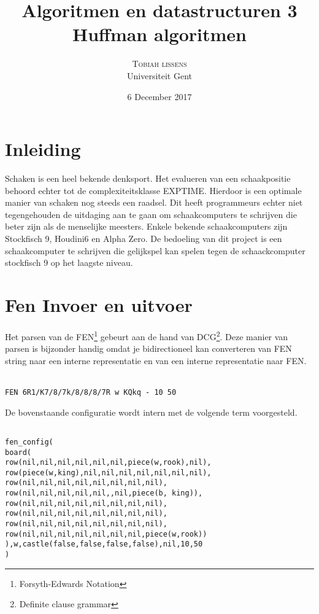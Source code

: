 \documentclass[twoside,twocolumn]{article}
\title{Algoritmen en datastructuren 3 \\ Huffman algoritmen } %
\author{%
\textsc{Tobiah lissens}\\[1ex]%
\normalsize Universiteit Gent \\ %
}
\date{6 December 2017} %
\newcommand{\code}[1]{\texttt{#1}}
\begin{document}
\lstset{language=Prolog} 
\maketitle


\section{Inleiding}
Schaken is een heel bekende denksport.
Het evalueren van een schaakpositie behoord echter tot de complexiteitsklasse EXPTIME.
Hierdoor is een optimale manier van schaken nog steeds een raadsel.
Dit heeft programmeurs echter niet tegengehouden de uitdaging aan te gaan om schaakcomputers te schrijven die beter zijn als de menselijke meesters.
Enkele bekende schaakcomputers zijn Stockfisch 9, Houdini6 en Alpha Zero.
De bedoeling van dit project is een schaakcomputer te schrijven die gelijkspel kan spelen tegen de schaackcomputer stockfisch 9 op het laagste niveau.

 

    
\section{Fen Invoer en uitvoer}
    Het parsen van de FEN\footnote{Forsyth-Edwards Notation} gebeurt aan de hand van DCG\footnote{Definite clause grammar}.
    Deze manier van parsen is bijzonder handig omdat je bidirectioneel kan converteren van FEN string naar een interne representatie en van een interne representatie naar FEN.
    
    \begin{center}
        \newgame
        \showboard
        \\
        \code{FEN 6R1/K7/8/7k/8/8/8/7R w KQkq - 10 50}
    \end{center}
    
    
De bovenstaande configuratie wordt intern met de volgende term voorgesteld.

    \begin{lstlisting}

fen_config(
board(
row(nil,nil,nil,nil,nil,nil,piece(w,rook),nil),
row(piece(w,king),nil,nil,nil,nil,nil,nil,nil),
row(nil,nil,nil,nil,nil,nil,nil,nil),
row(nil,nil,nil,nil,nil,,nil,piece(b, king)),
row(nil,nil,nil,nil,nil,nil,nil,nil),
row(nil,nil,nil,nil,nil,nil,nil,nil),
row(nil,nil,nil,nil,nil,nil,nil,nil),
row(nil,nil,nil,nil,nil,nil,nil,piece(w,rook))
),w,castle(false,false,false,false),nil,10,50
)
    \end{lstlisting}
\end{document}
